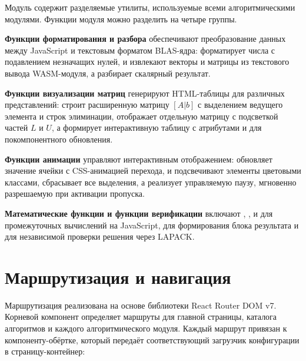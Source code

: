 \documentclass[12pt, oneside]{book}
\begin{document}
    \quad Модуль \texttt{} содержит разделяемые утилиты, используемые всеми алгоритмическими модулями. Функции модуля можно разделить на четыре группы.

    \quad \textbf{Функции форматирования и разбора} обеспечивают преобразование данных между JavaScript и текстовым форматом BLAS-ядра: \texttt{} форматирует числа с подавлением незначащих нулей, \texttt{} и \texttt{} извлекают векторы и матрицы из текстового вывода WASM-модуля, а \texttt{} разбирает скалярный результат.

    \quad \textbf{Функции визуализации матриц} генерируют HTML-таблицы для различных представлений: \texttt{} строит расширенную матрицу $[A|b]$ с выделением ведущего элемента и строк элиминации, \texttt{} отображает отдельную матрицу с подсветкой частей $L$ и $U$, а \texttt{} формирует интерактивную таблицу с атрибутами \texttt{} и \texttt{} для покомпонентного обновления.

    \quad \textbf{Функции анимации} управляют интерактивным отображением: \texttt{} обновляет значение ячейки с CSS-анимацией перехода, \texttt{} и \texttt{} подсвечивают элементы цветовыми классами, \texttt{} сбрасывает все выделения, а \texttt{} реализует управляемую паузу, мгновенно разрешаемую при активации пропуска.

    \quad \textbf{Математические функции и функции верификации} включают \texttt{}, \texttt{}, \texttt{} и \texttt{} для промежуточных вычислений на JavaScript, \texttt{} для формирования блока результата и \texttt{} для независимой проверки решения через LAPACK.

\section{Маршрутизация и навигация}

    \quad Маршрутизация реализована на основе библиотеки React Router DOM v7. Корневой компонент \texttt{} определяет маршруты для главной страницы, каталога алгоритмов и каждого алгоритмического модуля. Каждый маршрут привязан к компоненту-обёртке, который передаёт соответствующий загрузчик конфигурации в страницу-контейнер:
\end{document}
